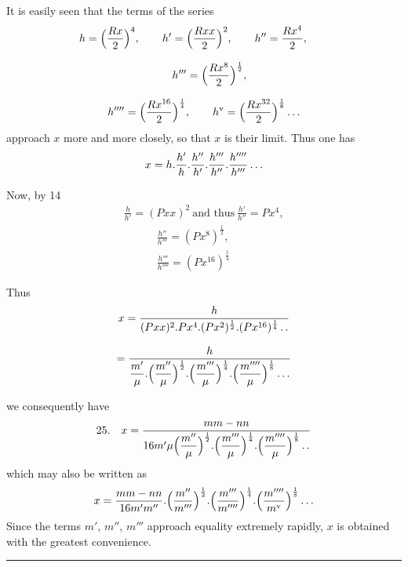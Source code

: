 It is easily seen that the terms of the series
\[
\begin{gathered}
h=\Bigl(\frac{Rx}{2}\Bigr)^4,\qquad
h'=\Bigl(\frac{Rxx}{2}\Bigr)^2,\qquad
h''=\frac{Rx^4}{2},\qquad
\\[8pt]\quad{}h'''=\Bigl(\frac{Rx^8}{2}\Bigr)^{\frac12},\\[8pt]
h''''=\Bigl(\frac{Rx^{16}}{2}\Bigr)^{\frac14},\qquad
h^{\mathrm{v}}=\Bigl(\frac{Rx^{32}}{2}\Bigr)^{\frac18}\mathinner{.\,.\,.}
\end{gathered}
\]
approach $x$ more and more closely, so that $x$ is their limit. Thus one has
\[
x=h.\frac{h'}{h}.\frac{h''}{h'}.\frac{h'''}{h''}.\frac{h''''}{h'''}\mathinner{.\,.\,.}
\]

Now, by 14
\[
\begin{gathered}\frac{h}{h'}=(Pxx)^2\ \text{and thus}\ \frac{h'}{h''}=Px^4,\\[8pt]\quad{}\qquad
\frac{h''}{h'''}=(Px^8)^{\frac12},\\[8pt]\quad{}\qquad
\frac{h'''}{h''''}=(Px^{16})^{\frac14}\end{gathered}
\]

Thus
\[
\begin{gathered}
x=\frac{h}{(Pxx)^2.Px^4.(Px^2)^{\frac12}.(Px^{16})^{\frac14}\mathinner{.\,.}}\\[8pt]
=\frac{h}{\dfrac{m'}{\mu}.\Bigl(\dfrac{m''}{\mu}\Bigr)^{\frac12}.\Bigl(\dfrac{m'''}{\mu}\Bigr)^{\frac14}.\Bigl(\dfrac{m''''}{\mu}\Bigr)^{\frac18}\mathinner{.\,.\,.}}
\end{gathered}
\]



we consequently have
\[
\begin{gathered}25.\quad x=\frac{mm-nn}{16m'\mu\Bigl(\dfrac{m''}{\mu}\Bigr)^{\frac12}.\Bigl(\dfrac{m'''}{\mu}\Bigr)^{\frac14}.\Bigl(\dfrac{m''''}{\mu}\Bigr)^{\frac18}\mathinner{.\,.}}\end{gathered}
\]
which may also be written as
\[
\begin{gathered}x=\frac{mm-nn}{16m'm''}.\Bigl(\frac{m''}{m'''}\Bigr)^{\frac12}.\Bigl(\frac{m'''}{m''''}\Bigr)^{\frac14}.\Bigl(\frac{m''''}{m^{\mathrm{v}}}\Bigr)^{\frac18}\mathinner{.\,.\,.}\end{gathered}
\]
Since the terms $m'$, $m''$, $m'''$ approach equality extremely rapidly, $x$ is obtained with the greatest convenience.
\begin{center}\rule{0.25\textwidth}{0.3pt}\end{center}





\clearpage
\endgroup
